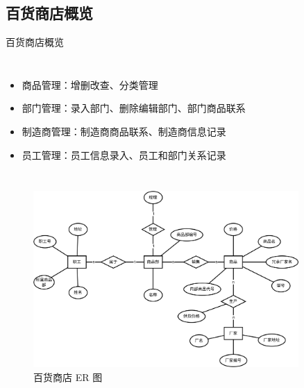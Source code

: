 \documentclass{ctexbeamer}
\begin{document}
\subsection{百货商店概览}
\begin{frame}{百货商店概览}
  \begin{columns}
      \begin{itemize}
        \item 商品管理：增删改查、分类管理
        \item 部门管理：录入部门、删除编辑部门、部门商品联系
        \item 制造商管理：制造商商品联系、制造商信息记录
        \item 员工管理：员工信息录入、员工和部门关系记录
      \end{itemize}
  \end{columns}
  \begin{columns}
      \begin{figure}
        \centering
        \includegraphics[width=0.9\textwidth]{fig/ER.png}
        \caption{百货商店 ER 图}
      \end{figure}
  \end{columns}
\end{frame}
\end{document}
